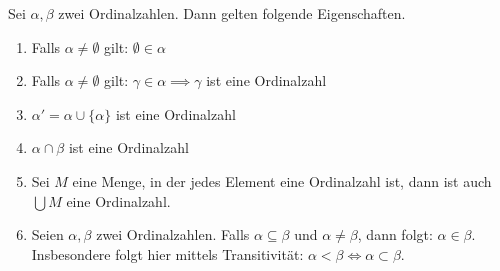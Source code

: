 \documentclass[11pt]{scrartcl}
\begin{document}
\begin{theorem}
	Sei $\alpha,\beta$ zwei Ordinalzahlen. Dann gelten folgende Eigenschaften.
	\begin{enumerate}
		\item Falls $\alpha\neq\emptyset$ gilt: $\emptyset \in \alpha$
		\item Falls $\alpha \neq \emptyset$ gilt: $\gamma \in \alpha \implies \gamma$ ist eine Ordinalzahl
		\item $\alpha'= \alpha \cup \{\alpha\}$ ist eine Ordinalzahl
		\item $\alpha \cap \beta$ ist eine Ordinalzahl
		\item Sei $M$ eine Menge, in der jedes Element eine Ordinalzahl ist, dann ist auch $\bigcup M$ eine Ordinalzahl.
		\item Seien $\alpha,\beta$ zwei Ordinalzahlen. Falls $\alpha \subseteq \beta$ und $\alpha \neq \beta$, dann folgt: $\alpha \in \beta$. Insbesondere folgt hier mittels Transitivität: $\alpha < \beta \iff \alpha \subset \beta$.
	\end{enumerate}
\end{theorem}
\end{document}

